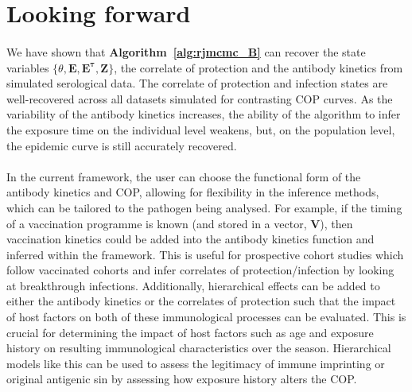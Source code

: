 \section{Looking forward}
\paragraph{}We have shown that \textbf{Algorithm~\ref{alg:rjmcmc_B}} can recover the state variables $\{\theta, \mathbf{E}, \mathbf{E^{\tau}}, \mathbf{Z}\}$, the correlate of protection and the antibody kinetics from simulated serological data.\cite{Menezes2023-ti} The correlate of protection and infection states are well-recovered across all datasets simulated for contrasting COP curves. As the variability of the antibody kinetics increases, the ability of the algorithm to infer the exposure time on the individual level weakens, but, on the population level, the epidemic curve is still accurately recovered.  

\paragraph{}In the current framework, the user can choose the functional form of the antibody kinetics and COP, allowing for flexibility in the inference methods, which can be tailored to the pathogen being analysed. For example, if the timing of a vaccination programme is known (and stored in a vector, $\mathbf{V}$), then vaccination kinetics could be added into the antibody kinetics function and inferred within the framework. This is useful for prospective cohort studies which follow vaccinated cohorts and infer correlates of protection/infection by looking at breakthrough infections. Additionally, hierarchical effects can be added to either the antibody kinetics or the correlates of protection such that the impact of host factors on both of these immunological processes can be evaluated. This is crucial for determining the impact of host factors such as age and exposure history on resulting immunological characteristics over the season. Hierarchical models like this can be used to assess the legitimacy of immune imprinting or original antigenic sin by assessing how exposure history alters the COP. 

